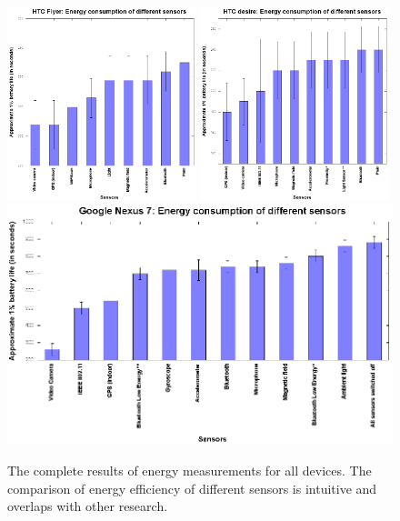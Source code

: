 \begin{figure}[H]
\centering
\includegraphics[width=0.49\textwidth, scale=0.6]{plots/htc_flyer}
\includegraphics[width=0.49\textwidth, scale=0.6]{plots/htc_desire}
\includegraphics[width=\textwidth, scale=0.9]{plots/google_nexus_7}
\caption{\label{p:all_results} The complete results of energy measurements for all devices. The comparison of energy efficiency of different sensors is intuitive and overlaps with other research. }
\end{figure}

